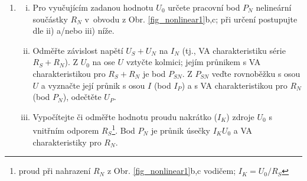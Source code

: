 \documentclass[a4paper, 11pt]{report}
\begin{document}
\begin{enumerate}[\bf {Experiment} 1:]
\item

\begin{enumerate}[i)]
\item
Pro vyučujícím zadanou hodnotu $U_0$
určete pracovní bod $P_N$ nelineární součástky $R_N$ v~obvodu z Obr. \ref{fig_nonlinear1}b,c;
 při určení postupujte dle ii) a/nebo iii) níže.

\item
Odměřte závislost napětí $U_S + U_N$ 
na $I_N$
(tj., VA charakteristiku série $R_S + R_N$).
Z $U_0$ na ose $U$ vztyčte kolmici; 
jejím průnikem s VA charakteristikou pro $R_S + R_N$
je bod $P_{SN}$. Z $P_{SN}$ veďte rovnoběžku s osou $U$
a vyznačte její průnik s osou $I$ (bod $I_P$)
a s VA charakteristikou pro $R_N$ (bod $P_N$),
odečtěte $U_P$.

\item
Vypočítejte či odměřte hodnotu proudu nakrátko ($I_K$) zdroje $U_0$ s vnitřním odporem $R_S$\footnote{proud 
při nahrazení $R_N$ z Obr. \ref{fig_nonlinear1}b,c vodičem; $I_K = U_0 / R_S$}.
Bod $P_N$ je průnik úsečky $I_K$$U_0$ a VA charakteristiky pro $R_N$. 

\end{enumerate}



\end{enumerate}
\end{document}
